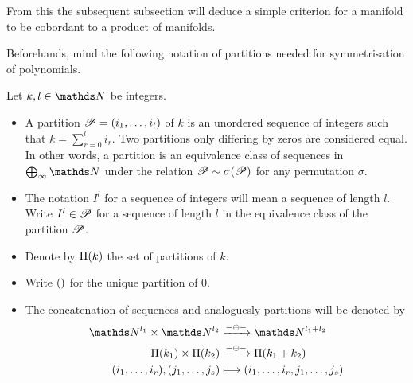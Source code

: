 From this the subsequent subsection will deduce a simple criterion for
a manifold to be cobordant to a product of manifolds. 

Beforehands, mind the following notation of partitions needed for
symmetrisation of polynomials.
\begin{Def}
  Let $k,l\in\Nat$ be integers.
  \begin{itemize}
  \item
    A partition $\mathscr{P}=(i_1,\dotsc,i_l)$ of $k$ is an unordered sequence
    of integers such that $k=\sum_{r=0}^{l}i_r$.
    Two partitions only differing by zeros are considered equal.
    In other words, a partition is an equivalence class of sequences in
    $\bigoplus_\infty\Nat$ under the relation $\mathscr{P}\sim\sigma(\mathscr{P})$
    for any permutation $\sigma$.
  \item
    The notation $I^l$ for a sequence of integers will mean a sequence
    of length $l$. Write $I^l\in\mathscr{P}$ for a sequence of length
    $l$ in the equivalence class of the partition $\mathscr{P}$. 
  \item
    Denote by $\Pi({k})$ the set of partitions of $k$.
  \item
    Write $()$ for the unique partition of $0$.
  \item The concatenation of sequences and analoguesly partitions will
    be denoted by
    \begin{align*}
      \Nat^{l_1} \times \Nat^{l_2}
      &\xrightarrow{-\concat-}
        \Nat^{l_1+l_2}
      \\
      \PartitionsOf{k_1} \times \PartitionsOf{k_2}
      &\xrightarrow{-\concat-}
        \PartitionsOf{k_1+k_2}
      \\
      (i_1,\dotsc,i_r), (j_1,\dotsc,j_s)
      &\longmapsto
        (i_1,\dotsc,i_r,j_1,\dotsc,j_s)
    \end{align*}
  \end{itemize}
\end{Def}

